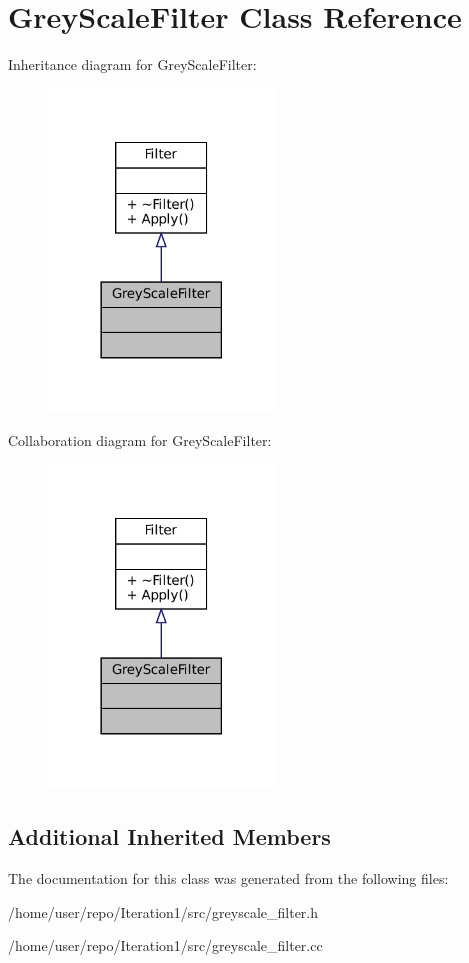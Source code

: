 \hypertarget{classGreyScaleFilter}{}\section{Grey\+Scale\+Filter Class Reference}
\label{classGreyScaleFilter}


Inheritance diagram for Grey\+Scale\+Filter\+:\nopagebreak
\begin{figure}[H]
\begin{center}
\leavevmode
\includegraphics[width=170pt]{classGreyScaleFilter__inherit__graph}
\end{center}
\end{figure}


Collaboration diagram for Grey\+Scale\+Filter\+:\nopagebreak
\begin{figure}[H]
\begin{center}
\leavevmode
\includegraphics[width=170pt]{classGreyScaleFilter__coll__graph}
\end{center}
\end{figure}
\subsection*{Additional Inherited Members}


The documentation for this class was generated from the following files\+:\begin{DoxyCompactItemize}
\item 
/home/user/repo/\+Iteration1/src/greyscale\+\_\+filter.\+h\item 
/home/user/repo/\+Iteration1/src/greyscale\+\_\+filter.\+cc\end{DoxyCompactItemize}
